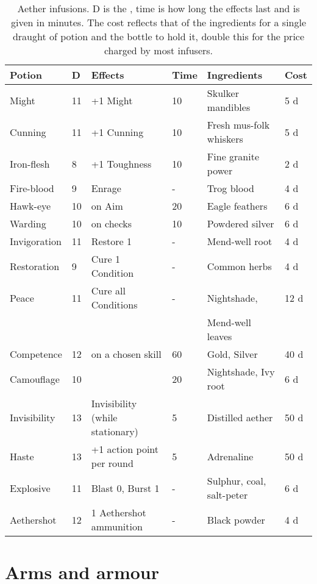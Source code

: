 \documentclass[a4paper,11pt,oneside]{book}
\newcommand{\textlf}[1]{\textbf{\titlecap{#1}}}
\begin{document}
\begin{table}[ht!]
\caption{Aether infusions. D is the \textlf{difficulty}, time is how long the effects last and is given in minutes. The cost reflects that of the ingredients for a single draught of potion and the bottle to hold it, double this for the price charged by most infusers.}
\begin{tabular}{|l|l|l|l|l|l|}
\hline
Potion & D & Effects & Time & Ingredients & Cost \\
\hline
Might &  11 & +1 Might & 10 & Skulker mandibles & 5 d \\
Cunning & 11 & +1 Cunning & 10 & Fresh mus-folk whiskers & 5 d \\
Iron-flesh & 8 & +1 Toughness & 10 & Fine granite power & 2 d \\
Fire-blood & 9 & Enrage & - & Trog blood & 4 d \\
Hawk-eye & 10 & \textlf{edge+} on Aim & 20 & Eagle feathers & 6 d \\
Warding & 10 & \textlf{edge+} on \textlf{resist} checks & 10 & Powdered silver & 6 d \\ 
Invigoration & 11 & Restore 1 \textlf{endurance} & - & Mend-well root & 4 d \\
Restoration & 9 & Cure 1 Condition & - & Common herbs & 4 d \\
Peace & 11 & Cure all Conditions & - & Nightshade,  & 12 d \\
 & & & & Mend-well leaves & \\
Competence & 12 & \textlf{edge+} on a chosen skill & 60 & Gold, Silver & 40 d \\
Camouflage & 10 & \textlf{Stealth edge+} & 20 & Nightshade, Ivy root & 6 d \\
Invisibility & 13 & Invisibility (while stationary) & 5 & Distilled aether & 50 d \\
Haste & 13 & +1 action point per round & 5 & Adrenaline & 50 d \\ 
Explosive & 11 & Blast 0, Burst 1 & - & Sulphur, coal, salt-peter & 6 d \\
Aethershot & 12 & 1 Aethershot ammunition & - & Black powder & 4 d \\ 
\hline
\end{tabular}
\label{tab:alch}
\end{table}




\chapter{Arms and armour}
\label{chap:arms}
\end{document}
